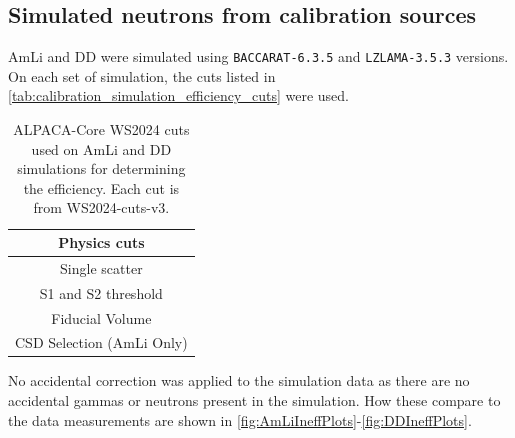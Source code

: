 \subsection{Simulated neutrons from calibration sources}
AmLi and DD were simulated using \lstinline{BACCARAT-6.3.5} and \lstinline{LZLAMA-3.5.3} versions.
On each set of simulation, the cuts listed in \autoref{tab:calibration_simulation_efficiency_cuts} were used.
\begin{table}
	\centering
	\begin{tabular}{c}
		Physics cuts              \\
		\hline
		Single scatter            \\
		S1 and S2 threshold       \\
		Fiducial Volume           \\
		CSD Selection (AmLi Only) \\
	\end{tabular}
	\caption{ALPACA-Core WS2024 cuts used on AmLi and DD simulations for determining the efficiency. Each cut is from WS2024-cuts-v3.}
	\label{tab:calibration_simulation_efficiency_cuts}
\end{table}
No accidental correction was applied to the simulation data as there are no accidental gammas or neutrons present in the simulation.
How these compare to the data measurements are shown in \autoref{fig:AmLiIneffPlots}-\ref{fig:DDIneffPlots}.
